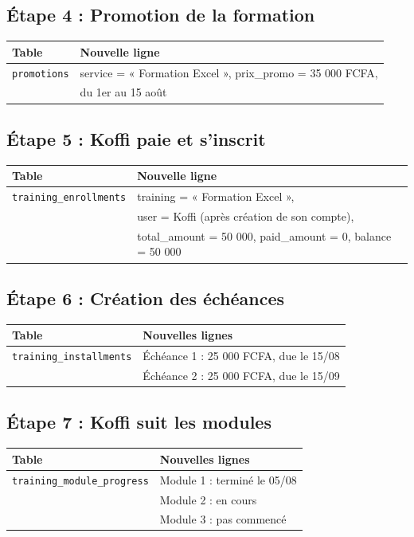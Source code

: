 \documentclass[12pt,a4paper]{article}
\begin{document}
\subsection*{Étape 4 : Promotion de la formation}

\begin{tabularx}{\textwidth}{l X}
    \textbf{Table} & \textbf{Nouvelle ligne} \\
    \midrule
    \texttt{promotions} & service = « Formation Excel », prix\_promo = 35 000 FCFA, \\
    & du 1er au 15 août \\
\end{tabularx}

\subsection*{Étape 5 : Koffi paie et s'inscrit}

\begin{tabularx}{\textwidth}{l X}
    \textbf{Table} & \textbf{Nouvelle ligne} \\
    \midrule
    \texttt{training\_enrollments} & training = « Formation Excel », \\
    & user = Koffi (après création de son compte), \\
    & total\_amount = 50 000, paid\_amount = 0, balance = 50 000 \\
\end{tabularx}

\subsection*{Étape 6 : Création des échéances}

\begin{tabularx}{\textwidth}{l X}
    \textbf{Table} & \textbf{Nouvelles lignes} \\
    \midrule
    \texttt{training\_installments} & Échéance 1 : 25 000 FCFA, due le 15/08 \\
    & Échéance 2 : 25 000 FCFA, due le 15/09 \\
\end{tabularx}

\subsection*{Étape 7 : Koffi suit les modules}

\begin{tabularx}{\textwidth}{l X}
    \textbf{Table} & \textbf{Nouvelles lignes} \\
    \midrule
    \texttt{training\_module\_progress} & Module 1 : terminé le 05/08 \\
    & Module 2 : en cours \\
    & Module 3 : pas commencé \\
\end{tabularx}
\end{document}
